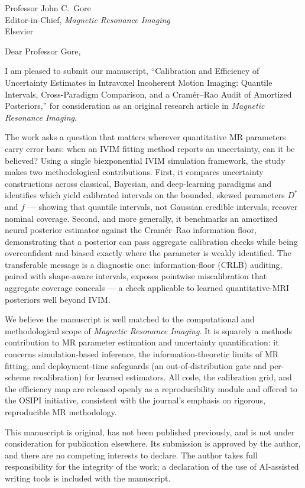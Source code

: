 \documentclass[11pt]{letter}
\begin{document}
\begin{letter}{Professor John C.\ Gore \\ Editor-in-Chief, \textit{Magnetic Resonance Imaging}
\\ Elsevier}

\opening{Dear Professor Gore,}

I am pleased to submit our manuscript, ``Calibration and Efficiency of Uncertainty Estimates
in Intravoxel Incoherent Motion Imaging: Quantile Intervals, Cross-Paradigm Comparison, and a
Cram\'er--Rao Audit of Amortized Posteriors,'' for consideration as an original research
article in \textit{Magnetic Resonance Imaging}.

The work asks a question that matters wherever quantitative MR parameters carry error bars:
when an IVIM fitting method reports an uncertainty, can it be believed? Using a single
biexponential IVIM simulation framework, the study makes two methodological contributions.
First, it compares uncertainty constructions across classical, Bayesian, and deep-learning
paradigms and identifies which yield calibrated intervals on the bounded, skewed parameters
$D^{*}$ and $f$ --- showing that quantile intervals, not Gaussian credible intervals, recover
nominal coverage. Second, and more generally, it benchmarks an amortized neural posterior
estimator against the Cram\'er--Rao information floor, demonstrating that a posterior can pass
aggregate calibration checks while being overconfident and biased exactly where the parameter
is weakly identified. The transferable message is a diagnostic one: information-floor (CRLB)
auditing, paired with shape-aware intervals, exposes pointwise miscalibration that aggregate
coverage conceals --- a check applicable to learned quantitative-MRI posteriors well beyond
IVIM.

We believe the manuscript is well matched to the computational and methodological scope of
\textit{Magnetic Resonance Imaging}. It is squarely a methods contribution to MR parameter
estimation and uncertainty quantification: it concerns simulation-based inference, the
information-theoretic limits of MR fitting, and deployment-time safeguards (an
out-of-distribution gate and per-scheme recalibration) for learned estimators. All code, the
calibration grid, and the efficiency map are released openly as a reproducibility module and
offered to the OSIPI initiative, consistent with the journal's emphasis on rigorous,
reproducible MR methodology.

This manuscript is original, has not been published previously, and is not under consideration
for publication elsewhere. Its submission is approved by the author, and there are no competing
interests to declare. The author takes full responsibility for the integrity of the work; a
declaration of the use of AI-assisted writing tools is included with the manuscript.


\end{letter}
\end{document}
